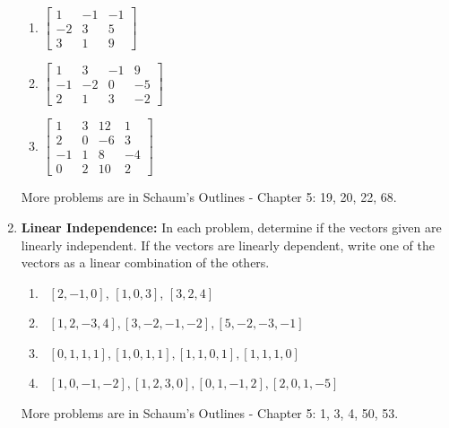 \begin{enumerate}
\begin{multicols}{4}
\begin{enumerate}
	\item \label{rank2}
$
\begin{bmatrix}
 1 & -1 & -1 \\
 -2 & 3 & 5 \\
 3 & 1 & 9
\end{bmatrix}
$

	\item 
$
\begin{bmatrix}
 1 & 3 & -1 & 9 \\
 -1 & -2 & 0 & -5 \\
 2 & 1 & 3 & -2
\end{bmatrix}
$

	\item \label{rank4}
$
\begin{bmatrix}
 1 & 3 & 12 & 1 \\
 2 & 0 & -6 & 3 \\
 -1 & 1 & 8 & -4 \\
 0 & 2 & 10 & 2
\end{bmatrix}
$

\end{enumerate}
\end{multicols}

More problems are in Schaum's Outlines - 
Chapter 5:
19, 20, 22, 68.





\item \textbf{Linear Independence:} In each problem, determine if the vectors given are linearly independent. If the vectors are linearly dependent, write one of the vectors as a linear combination of the others.
\begin{multicols}{2}
\begin{enumerate}
	\item \,
	$[2, -1, 0]$, $[1, 0, 3]$, $[3, 2, 4]$

	\item \,
$[1, 2, -3, 4], [3, -2, -1, -2], [5, -2, -3, -1]$

	\item \,
$[0, 1, 1, 1], [1, 0, 1, 1], [1, 1, 0, 1], [1, 1, 1, 0]$

	\item \,
$[1, 0, -1, -2], [1, 2, 3, 0], [0, 1, -1, 2], [2, 0, 1, -5]$
\end{enumerate}
\end{multicols}

More problems are in Schaum's Outlines - 
Chapter 5:
1, 3, 4, 50, 53.



\end{enumerate}
